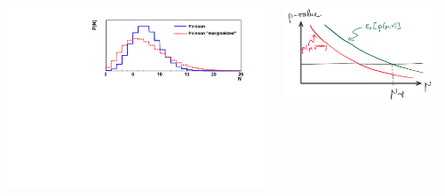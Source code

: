 \begin{frame}
\begin{small}
\begin{maliste}
\vspace*{-0.8cm}
\begin{columns}
\begin{column}{0.5\textwidth}
\begin{center}
\includegraphics[width=1.2\textwidth]{Figures/Stat/PoissonGammaCompoundExample_compound.pdf}
\end{center}
\end{column}
\begin{column}{0.5\textwidth}
\begin{center}
\vspace*{0.4cm}
\includegraphics[width=0.9\textwidth]{Figures/Stat/NeymanConstruction1DHybrid_cropped.png}
\end{center}
\end{column}
\end{columns}

\end{maliste}
\vspace*{-0.2cm}


\end{small}
\end{frame}
